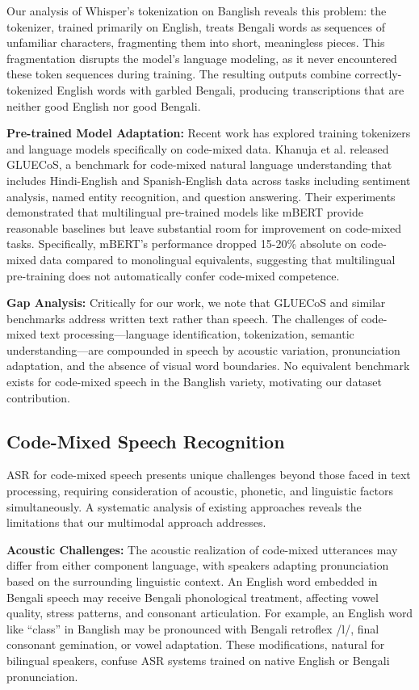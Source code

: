 Our analysis of Whisper's tokenization on Banglish reveals this problem: the tokenizer, trained primarily on English, treats Bengali words as sequences of unfamiliar characters, fragmenting them into short, meaningless pieces. This fragmentation disrupts the model's language modeling, as it never encountered these token sequences during training. The resulting outputs combine correctly-tokenized English words with garbled Bengali, producing transcriptions that are neither good English nor good Bengali.

\textbf{Pre-trained Model Adaptation:} Recent work has explored training tokenizers and language models specifically on code-mixed data. Khanuja et al. \cite{Khanuja2020} released GLUECoS, a benchmark for code-mixed natural language understanding that includes Hindi-English and Spanish-English data across tasks including sentiment analysis, named entity recognition, and question answering. Their experiments demonstrated that multilingual pre-trained models like mBERT \cite{Devlin2019} provide reasonable baselines but leave substantial room for improvement on code-mixed tasks. Specifically, mBERT's performance dropped 15-20\% absolute on code-mixed data compared to monolingual equivalents, suggesting that multilingual pre-training does not automatically confer code-mixed competence.

\textbf{Gap Analysis:} Critically for our work, we note that GLUECoS and similar benchmarks address written text rather than speech. The challenges of code-mixed text processing---language identification, tokenization, semantic understanding---are compounded in speech by acoustic variation, pronunciation adaptation, and the absence of visual word boundaries. No equivalent benchmark exists for code-mixed speech in the Banglish variety, motivating our dataset contribution.

\subsection{Code-Mixed Speech Recognition}

ASR for code-mixed speech presents unique challenges beyond those faced in text processing, requiring consideration of acoustic, phonetic, and linguistic factors simultaneously. A systematic analysis of existing approaches reveals the limitations that our multimodal approach addresses.

\textbf{Acoustic Challenges:} The acoustic realization of code-mixed utterances may differ from either component language, with speakers adapting pronunciation based on the surrounding linguistic context. An English word embedded in Bengali speech may receive Bengali phonological treatment, affecting vowel quality, stress patterns, and consonant articulation. For example, an English word like ``class'' in Banglish may be pronounced with Bengali retroflex /l/, final consonant gemination, or vowel adaptation. These modifications, natural for bilingual speakers, confuse ASR systems trained on native English or Bengali pronunciation.

